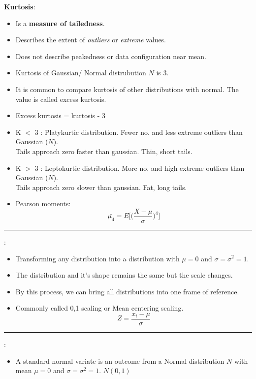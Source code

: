 \documentclass[	DIV=calc,%
paper=a4,%
fontsize=11pt,%
twocolumn]{scrartcl} %
\newcommand{\hformbar}[1]{\vspace{5pt}\hrule\vspace{10pt}} %
\newcommand{\formdesc}[1]{\noindent\textbf{#1}}
\begin{document}
\formdesc{Kurtosis}:
\begin{itemize}
	\item Is a  \textbf{measure of tailedness}.
	\item Describes the extent of \emph{outliers} or \emph{extreme} values.
	\item Does not describe peakedness or data configuration near mean.
	\item Kurtosis of Gaussian/ Normal distrubution $N$ is 3.
	\item It is common to compare kurtosis of other distributions with normal. The value is called excess kurtosis.
	\item Excess kurtosis = kurtosis - 3
	\item K $<$ 3 : Platykurtic distribution. Fewer no. and less extreme outliers than Gaussian ($N$).\\ Tails approach zero faster than gaussian. Thin, short tails.
	\item K $>$ 3 : Leptokurtic distribution. More no. and high extreme outliers than Gaussian ($N$).\\ Tails approach zero slower than gaussian. Fat, long tails.
	\item Pearson moments: $$\bar{\mu_4} = E\Bigg[\Big({\frac{X-\mu}{\sigma}}\Big)^4\Bigg]$$
\end{itemize}

\hformbar

\formdesc{Standardisation}:

\begin{itemize}
	\item Transforming any distribution into a distribution with $\mu=0$ and $\sigma=\sigma^2=1$.
	\item The distribution and it's shape remains the same but the scale changes.
	\item By this process, we can bring all distributions into one frame of reference.
	\item Commonly called 0,1 scaling or  Mean centering scaling.
	$$Z=\frac{x_i-\mu}{\sigma}$$
\end{itemize}
\hformbar

\formdesc{Standard Normal variate}:
\begin{itemize}
	\item A standard normal variate is an outcome from a Normal distribution $N$ with mean $\mu=0$ and $\sigma=\sigma^2=1$.  $N(0,1)$
	
\end{itemize}
\end{document}

